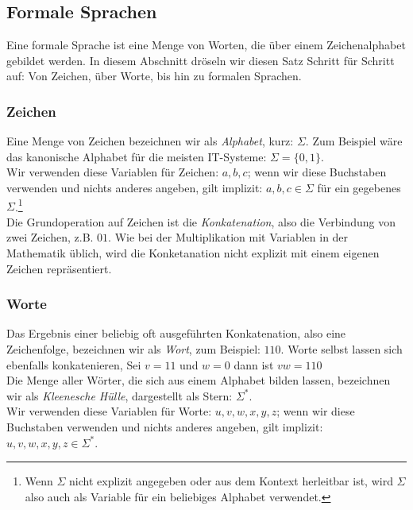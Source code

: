 \subsection{Formale Sprachen}\label{subsec:formaleSprachen}

Eine formale Sprache ist eine Menge von Worten,
die über einem Zeichenalphabet gebildet werden.
In diesem Abschnitt dröseln wir diesen Satz Schritt für Schritt auf:
Von Zeichen, über Worte, bis hin zu formalen Sprachen.

\subsubsection{Zeichen}

Eine Menge von Zeichen bezeichnen wir als \emph{Alphabet}, kurz: $\Sigma$.
Zum Beispiel wäre das kanonische Alphabet für die meisten IT-Systeme: $\Sigma = \{0,1\}$.\\

\noindent
Wir verwenden diese Variablen für Zeichen: $a,b,c$;
wenn wir diese Buchstaben verwenden und nichts anderes angeben,
gilt implizit: $a, b, c \in \Sigma$ für ein gegebenes $\Sigma$.\footnote{
Wenn $\Sigma$ nicht explizit angegeben oder aus dem Kontext herleitbar ist,
wird $\Sigma$ also auch als Variable für ein beliebiges Alphabet verwendet.}\\

\noindent
Die Grundoperation auf Zeichen ist die \emph{Konkatenation},
also die Verbindung von zwei Zeichen, z.B. $01$.
Wie bei der Multiplikation mit Variablen in der Mathematik üblich,
wird die Konketanation nicht explizit mit einem eigenen Zeichen repräsentiert.

\subsubsection{Worte}\label{words}
Das Ergebnis einer beliebig oft ausgeführten Konkatenation,
also eine Zeichenfolge,
bezeichnen wir als \emph{Wort}, zum Beispiel: $110$.
Worte selbst lassen sich ebenfalls konkatenieren,
Sei $v = 11$ und $w = 0$ dann ist $vw = 110$\\

\noindent
Die Menge aller Wörter,
die sich aus einem Alphabet bilden lassen,
bezeichnen wir als \emph{Kleenesche Hülle}, dargestellt als Stern: $\Sigma^*$.\\

\noindent
Wir verwenden diese Variablen für Worte:
$u, v, w, x, y, z$; wenn wir diese Buchstaben verwenden und nichts anderes angeben,
gilt implizit: $u, v, w, x, y, z \in \Sigma^*$.\\

